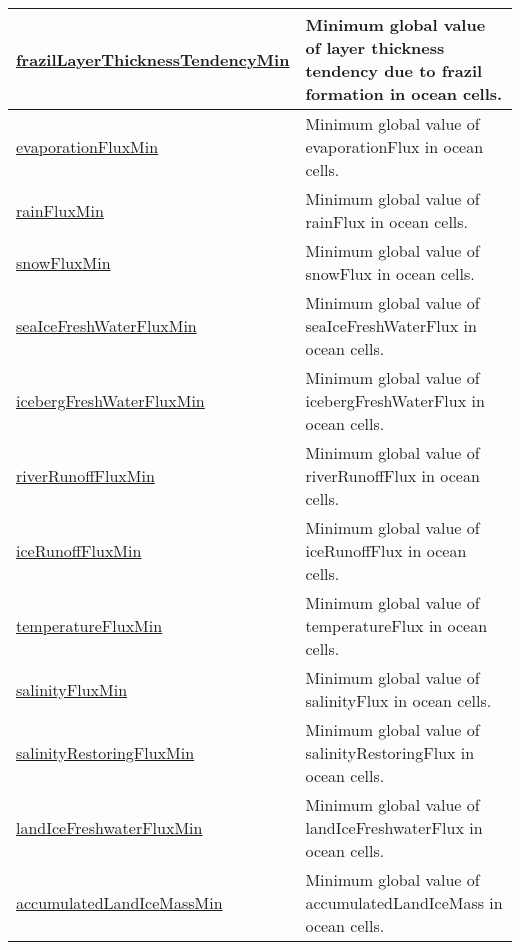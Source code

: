 {\begin{center}
\begin{longtable}{| p{2.0in} | p{4.0in} |}
    \hline
    \hyperref[subsec:var_sec_globalStatsAM_frazilLayerThicknessTendencyMin]{frazilLayerThicknessTendencyMin} & Minimum global value of layer thickness tendency due to frazil formation in ocean cells. \\
    \hline
    \hyperref[subsec:var_sec_globalStatsAM_evaporationFluxMin]{evaporationFluxMin} & Minimum global value of evaporationFlux in ocean cells. \\
    \hline
    \hyperref[subsec:var_sec_globalStatsAM_rainFluxMin]{rainFluxMin} & Minimum global value of rainFlux in ocean cells. \\
    \hline
    \hyperref[subsec:var_sec_globalStatsAM_snowFluxMin]{snowFluxMin} & Minimum global value of snowFlux in ocean cells. \\
    \hline
    \hyperref[subsec:var_sec_globalStatsAM_seaIceFreshWaterFluxMin]{seaIceFreshWaterFluxMin} & Minimum global value of seaIceFreshWaterFlux in ocean cells. \\
    \hline
    \hyperref[subsec:var_sec_globalStatsAM_icebergFreshWaterFluxMin]{icebergFreshWaterFluxMin} & Minimum global value of icebergFreshWaterFlux in ocean cells. \\
    \hline
    \hyperref[subsec:var_sec_globalStatsAM_riverRunoffFluxMin]{riverRunoffFluxMin} & Minimum global value of riverRunoffFlux in ocean cells. \\
    \hline
    \hyperref[subsec:var_sec_globalStatsAM_iceRunoffFluxMin]{iceRunoffFluxMin} & Minimum global value of iceRunoffFlux in ocean cells. \\
    \hline
    \hyperref[subsec:var_sec_globalStatsAM_temperatureFluxMin]{temperatureFluxMin} & Minimum global value of temperatureFlux in ocean cells. \\
    \hline
    \hyperref[subsec:var_sec_globalStatsAM_salinityFluxMin]{salinityFluxMin} & Minimum global value of salinityFlux in ocean cells. \\
    \hline
    \hyperref[subsec:var_sec_globalStatsAM_salinityRestoringFluxMin]{salinityRestoringFluxMin} & Minimum global value of salinityRestoringFlux in ocean cells. \\
    \hline
    \hyperref[subsec:var_sec_globalStatsAM_landIceFreshwaterFluxMin]{landIceFreshwaterFluxMin} & Minimum global value of landIceFreshwaterFlux in ocean cells. \\
    \hline
    \hyperref[subsec:var_sec_globalStatsAM_accumulatedLandIceMassMin]{accumulatedLandIceMassMin} & Minimum global value of accumulatedLandIceMass in ocean cells. \\

\end{longtable}
\end{center}}
